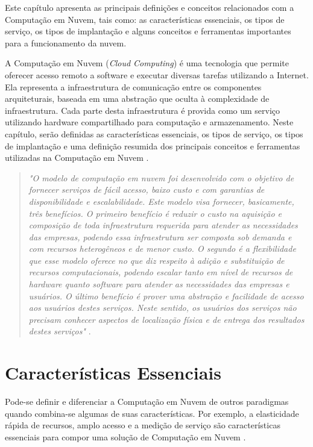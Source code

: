 Este capítulo apresenta as principais definições e conceitos relacionados com a Computação em Nuvem, tais como: as características essenciais, os tipos de serviço, os tipos de implantação e alguns conceitos e ferramentas importantes para a funcionamento da nuvem.


A Computação em Nuvem (\textit{Cloud Computing}) é uma tecnologia que permite oferecer acesso remoto a software e executar diversas tarefas utilizando a Internet. Ela representa a infraestrutura de comunicação entre os componentes arquiteturais, baseada em uma abstração que oculta à complexidade de infraestrutura. Cada parte desta infraestrutura é provida como um serviço utilizando hardware compartilhado para computação e armazenamento.
Neste capítulo, serão definidas as características essenciais, os tipos de serviço, os tipos de implantação e uma definição resumida dos principais conceitos e ferramentas utilizadas na Computação em Nuvem \cite{ERCEMAPI2009}. 

\begin{quote}
\textit{"O modelo de computação em nuvem foi desenvolvido com o objetivo de fornecer serviços de fácil acesso, baixo custo e com garantias de disponibilidade e escalabilidade. Este modelo visa fornecer, basicamente, três benefícios. O primeiro benefício é reduzir o custo na aquisição e composição de toda infraestrutura requerida para atender as necessidades das empresas, podendo essa infraestrutura ser composta sob demanda e com recursos heterogêneos e de menor custo. O segundo é a flexibilidade que esse modelo oferece no que diz respeito à adição e substituição de recursos computacionais, podendo escalar tanto em nível de recursos de hardware quanto software para atender as necessidades das empresas e usuários. O último benefício é prover uma abstração e facilidade de acesso aos usuários destes serviços. Neste sentido, os usuários dos serviços não precisam conhecer aspectos de localização física e de entrega dos resultados destes serviços"} \cite{ERCEMAPI2009}.
\end{quote}

\section{Características Essenciais}

Pode-se definir e diferenciar a Computação em Nuvem de outros paradigmas quando combina-se algumas de suas características. Por exemplo, a elasticidade rápida de recursos, amplo acesso e a medição de serviço são características essenciais para compor uma solução de Computação em Nuvem \cite{ERCEMAPI2009}.


